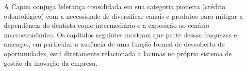 A Capim conjuga liderança consolidada em sua categoria pioneira (crédito odontológico) com a necessidade de diversificar canais e produtos para mitigar a dependência do dentista como intermediário e a exposição ao cenário macroeconômico. Os capítulos seguintes mostram que parte dessas fraquezas e ameaças, em particular a ausência de uma função formal de descoberta de oportunidades, está diretamente relacionada a lacunas no próprio sistema de gestão da inovação da empresa.
